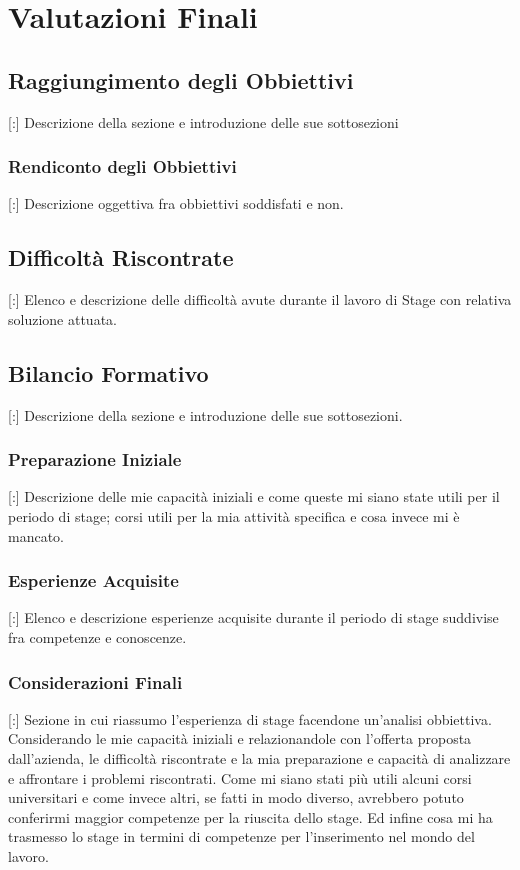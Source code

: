 
\chapter{Valutazioni Finali}
\thispagestyle{fancy} 

\section{Raggiungimento degli Obbiettivi}

[:] Descrizione della sezione e introduzione delle sue sottosezioni

\subsection{Rendiconto degli Obbiettivi}

[:] Descrizione oggettiva fra obbiettivi soddisfati e non.


\section{Difficoltà Riscontrate}

[:] Elenco e descrizione delle difficoltà avute durante il lavoro di Stage con relativa soluzione attuata.

\section{Bilancio Formativo}

[:] Descrizione della sezione e introduzione delle sue sottosezioni.

\subsection{Preparazione Iniziale}

[:] Descrizione delle mie capacità iniziali e come queste mi siano state utili per il periodo di stage; corsi utili per la mia attività specifica e cosa invece mi è mancato.

\subsection{Esperienze Acquisite}

[:] Elenco e descrizione esperienze acquisite durante il periodo di stage suddivise fra competenze e conoscenze.

\subsection{Considerazioni Finali}

[:] Sezione in cui riassumo l'esperienza di stage facendone un'analisi obbiettiva. Considerando le mie capacità iniziali e relazionandole con l'offerta proposta dall'azienda, le difficoltà riscontrate e la mia preparazione e capacità di analizzare e affrontare i problemi riscontrati. Come mi siano stati più utili alcuni corsi universitari e come invece altri, se fatti in modo diverso, avrebbero potuto conferirmi maggior competenze per la riuscita dello stage. Ed infine cosa mi ha trasmesso lo stage in termini di competenze per l'inserimento nel mondo del lavoro.
